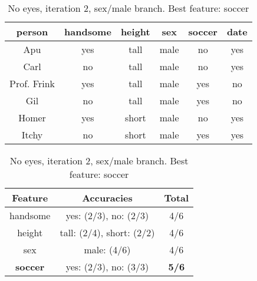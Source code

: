 \begin{table}[h!]
  \centering
  \begin{tabular}{ccccc|c}
    \toprule
    person      & handsome & height & sex    & soccer & date\\
    \midrule
    Apu         & yes      & tall   & male   & no     & yes \\
    Carl        & no       & tall   & male   & no     & yes \\
    Prof. Frink & yes      & tall   & male   & yes    & no  \\
    Gil         & no       & tall   & male   & yes    & no  \\
    Homer       & yes      & short  & male   & no     & yes \\
    Itchy       & no       & short  & male   & yes    & yes \\
    \bottomrule
  \end{tabular}

  \vspace{.5cm}

  \begin{tabular}{ccc}
    \toprule
    Feature         & Accuracies                              & Total\\
    \midrule
    handsome        & yes: (2/3), no: (2/3)                   & 4/6\\
    height          & tall: (2/4), short: (2/2)               & 4/6\\
    sex             & male: (4/6)                             & 4/6\\
    \textbf{soccer} & yes: (2/3), no: (3/3)                   & \textbf{5/6}\\
    \bottomrule
  \end{tabular}
  \caption*{No eyes, iteration 2, sex/male branch. Best feature: soccer}
\end{table}

